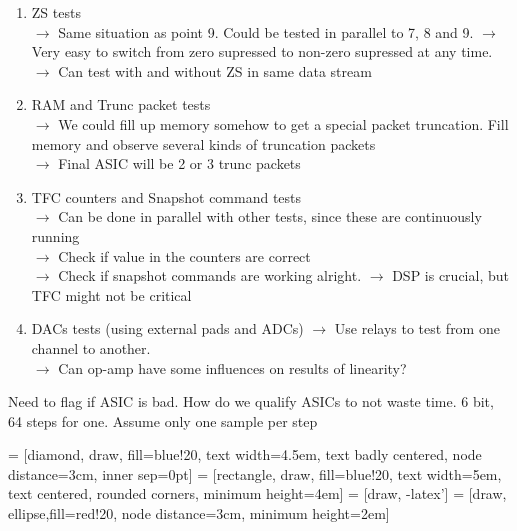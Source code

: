 \documentclass{lhcbnote}
\begin{document}
\begin{enumerate}
\item ZS tests \\
$\rightarrow$ Same situation as point 9. Could be tested in parallel to 7, 8 and 9.
$\rightarrow$ Very easy to switch from zero supressed to non-zero supressed at any time.
$\rightarrow$ Can test with and without ZS in same data stream

\item RAM and Trunc packet tests \\
$\rightarrow$ We could fill up memory somehow to get a special packet truncation. Fill memory and observe several kinds of truncation packets \\
$\rightarrow$ Final ASIC will be 2 or 3 trunc packets 

\item TFC counters and Snapshot command tests \\
$\rightarrow$ Can be done in parallel with other tests, since these are continuously running \\
$\rightarrow$ Check if value in the counters are correct \\
$\rightarrow$ Check if snapshot commands are working alright.
$\rightarrow$ DSP is crucial, but TFC might not be critical

\item DACs tests (using external pads and ADCs)
$\rightarrow$ Use relays to test from one channel to another. \\
$\rightarrow$ Can op-amp have some influences on results of linearity?
\end{enumerate}

Need to flag if ASIC is bad. How do we qualify ASICs to not waste time. 6 bit, 64 steps for one. Assume only one sample per step


 = [diamond, draw, fill=blue!20, 
    text width=4.5em, text badly centered, node distance=3cm, inner sep=0pt]
 = [rectangle, draw, fill=blue!20, 
    text width=5em, text centered, rounded corners, minimum height=4em]
 = [draw, -latex']
 = [draw, ellipse,fill=red!20, node distance=3cm,
    minimum height=2em]
    
\end{document}
